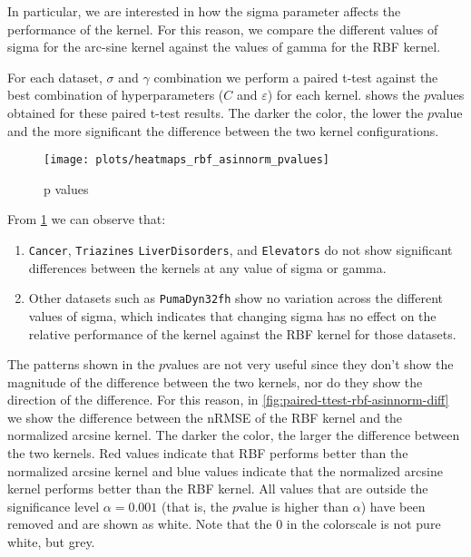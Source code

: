 In particular, we are interested in how
the sigma parameter affects the performance of the kernel. For this reason,
we compare the different values of sigma for the arc-sine kernel against the
values of gamma for the RBF kernel.

For each dataset, $\sigma$ and $\gamma$ combination we perform a paired t-test
against the best combination of hyperparameters ($C$ and $\varepsilon$) for
each kernel.  shows the $p$\textendash{}values
obtained for these paired t-test results. The darker the color, the lower the
$p$\textendash{}value and the more significant the difference between the two
kernel configurations.

\begin{figure}[H]
    \texttt{[image: plots/heatmaps\_rbf\_asinnorm\_pvalues]}
    \caption{p values}
    \label{fig:paired-ttest-rbf-asinnorm}
\end{figure}

From \cref{fig:paired-ttest-rbf-asinnorm} we can observe that:
\begin{enumerate}
    \item \texttt{Cancer}, \texttt{Triazines} \texttt{LiverDisorders}, and \texttt{Elevators} do not
          show significant differences between the kernels at any value of sigma or gamma.
    \item Other datasets such as \texttt{PumaDyn32fh} show no variation across the different
          values of sigma, which indicates that changing sigma has no effect on the
          relative performance of the kernel against the RBF kernel for those datasets.
\end{enumerate}

The patterns shown in the $p$\textendash{}values are not very useful since they
don't show the magnitude of the difference between the two kernels, nor do they
show the direction of the difference. For this reason, in \cref{fig:paired-ttest-rbf-asinnorm-diff}
we show the difference between the nRMSE of the RBF kernel and the normalized arcsine
kernel. The darker the color, the larger the difference between the two kernels. Red
values indicate that RBF performs better than the normalized arcsine kernel and blue
values indicate that the normalized arcsine kernel performs better than the RBF kernel.
All values that are outside the significance level $\alpha=0.001$ (that is, the
$p$\textendash{}value is higher than $\alpha$) have been removed and are shown as
white. Note that the $0$ in the colorscale is not pure white, but grey.

